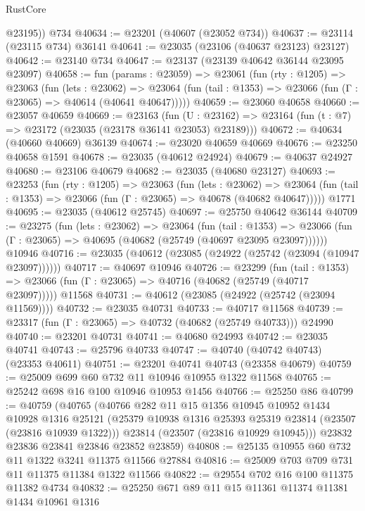 \begin{lexlean}{RustCore}
\begin{coremodule}
        @23195))
    @734
@40634 := @23201 (@40607 (@23052 @734))
@40637 := @23114 (@23115 @734) @36141
@40641 := @23035 (@23106 (@40637 @23123) @23127)
@40642 := @23140 @734
@40647 := @23137 (@23139 @40642 @36144 @23095 @23097)
@40658 := fun (params : @23059) =>
  @23061
    (fun (rty : @1205) =>
    @23063
      (fun (lets : @23062) =>
      @23064 (fun (tail : @1353) => @23066 (fun (Γ : @23065) => @40614 (@40641 @40647)))))
@40659 := @23060 @40658
@40660 := @23057 @40659
@40669 := @23163
    (fun (U : @23162) => @23164 (fun (t : @7) => @23172 (@23035 (@23178 @36141 @23053) @23189)))
@40672 := @40634 (@40660 @40669) @36139
@40674 := @23020 @40659 @40669
@40676 := @23250 @40658 @1591
@40678 := @23035 (@40612 @24924)
@40679 := @40637 @24927
@40680 := @23106 @40679
@40682 := @23035 (@40680 @23127)
@40693 := @23253
    (fun (rty : @1205) =>
    @23063
      (fun (lets : @23062) =>
      @23064 (fun (tail : @1353) => @23066 (fun (Γ : @23065) => @40678 (@40682 @40647)))))
    @1771
@40695 := @23035 (@40612 @25745)
@40697 := @25750 @40642 @36144
@40709 := @23275
    (fun (lets : @23062) =>
    @23064
      (fun (tail : @1353) =>
      @23066 (fun (Γ : @23065) => @40695 (@40682 (@25749 (@40697 @23095 @23097))))))
    @10946
@40716 := @23035 (@40612 (@23085 (@24922 (@25742 (@23094 (@10947 @23097))))))
@40717 := @40697 @10946
@40726 := @23299
    (fun (tail : @1353) => @23066 (fun (Γ : @23065) => @40716 (@40682 (@25749 (@40717 @23097)))))
    @11568
@40731 := @40612 (@23085 (@24922 (@25742 (@23094 @11569))))
@40732 := @23035 @40731
@40733 := @40717 @11568
@40739 := @23317 (fun (Γ : @23065) => @40732 (@40682 (@25749 @40733))) @24990
@40740 := @23201 @40731
@40741 := @40680 @24993
@40742 := @23035 @40741
@40743 := @25796 @40733
@40747 := @40740 (@40742 @40743) (@23353 @40611)
@40751 := @23201 @40741 @40743 (@23358 @40679)
@40759 := @25009 @699 @60 @732 @11 @10946 @10955 @1322 @11568
@40765 := @25242 @698 @16 @100 @10946 @10953 @1456
@40766 := @25250 @86
@40799 := @40759
    (@40765
      (@40766
        @282
        @11
        @15
        @1356
        @10945
        @10952
        @1434
        @10928
        @1316
        @25121
        (@25379 @10938 @1316 @25393 @25319 @23814 (@23507 (@23816 @10939 @1322)))
        @23814
        (@23507 (@23816 @10929 @10945)))
      @23832
      @23836
      @23841
      @23846
      @23852
      @23859)
@40808 := @25135 @10955 @60 @732 @11 @1322 @3241 @11375 @11566 @27884
@40816 := @25009 @703 @709 @731 @11 @11375 @11384 @1322 @11566
@40822 := @29554 @702 @16 @100 @11375 @11382 @4734
@40832 := @25250 @671 @89 @11 @15 @11361 @11374 @11381 @1434 @10961 @1316

\end{coremodule}
\end{lexlean}
